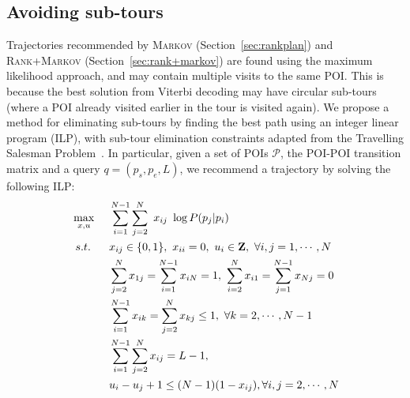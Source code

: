 \secmoveup
\subsection{Avoiding sub-tours} %
\label{sec:nosubtour}

Trajectories recommended by \textsc{Markov} (Section~\ref{sec:rankplan}) and \textsc{Rank+Markov} (Section~\ref{sec:rank+markov})
are found using the maximum likelihood approach, and may contain multiple visits to the same POI.
This is because the best solution from Viterbi decoding %
may have
circular sub-tours (where a POI already visited earlier in the tour is visited again).
We propose a method for eliminating sub-tours by %
%
finding the best path using an integer linear program (ILP),
with sub-tour elimination constraints adapted from the Travelling Salesman Problem~\cite{opt98}.
In particular, given a set of POIs $\mathcal{P}$, the POI-POI transition matrix and a query $q = (p_s, p_e, L)$,
we recommend a trajectory by solving the following ILP:
\eqmoveup
\begin{alignat}{5}
\eqmoveup
& \max_{x,u}  ~&& \sum_{i=1}^{N-1} \sum_{j=2}^N ~x_{ij} ~\log P(p_j | p_i)                                                 \nonumber \\
& ~s.t. ~&& x_{ij} \in \{0, 1\}, ~x_{ii} = 0, ~u_i \in \mathbf{Z}, ~\forall i, j = 1, \cdots, N                    \label{eq:cons1} \\
&        && \sum_{j=2}^N x_{1j} = \sum_{i=1}^{N-1} x_{iN} = 1, ~\sum_{i=2}^N x_{i1} = \sum_{j=1}^{N-1} x_{Nj} = 0  \label{eq:cons2} \\
&        && \sum_{i=1}^{N-1} x_{ik} = \sum_{j=2}^N x_{kj} \le 1,   ~\forall k=2, \cdots, N-1                       \label{eq:cons3} \\
&        && \sum_{i=1}^{N-1} \sum_{j=2}^N x_{ij} = L-1,                                                            \label{eq:cons4} \\
&        && u_i - u_j + 1 \le (N-1) (1-x_{ij}),                     \forall i, j = 2, \cdots, N                    \label{eq:cons5}
\end{alignat}
